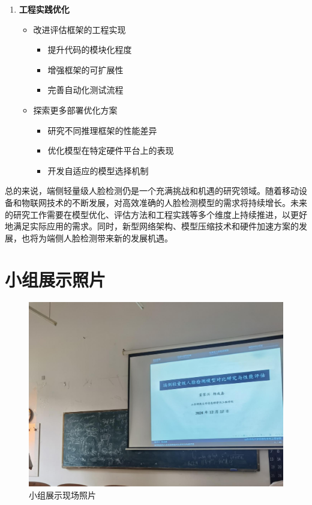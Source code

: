 \documentclass{article}
\begin{document}
\begin{enumerate}
    \item \textbf{工程实践优化}
    \begin{itemize}
        \item 改进评估框架的工程实现
        \begin{itemize}
            \item 提升代码的模块化程度
            \item 增强框架的可扩展性
            \item 完善自动化测试流程
        \end{itemize}
        \item 探索更多部署优化方案
        \begin{itemize}
            \item 研究不同推理框架的性能差异
            \item 优化模型在特定硬件平台上的表现
            \item 开发自适应的模型选择机制
        \end{itemize}
    \end{itemize}
\end{enumerate}

总的来说，端侧轻量级人脸检测仍是一个充满挑战和机遇的研究领域。随着移动设备和物联网技术的不断发展，对高效准确的人脸检测模型的需求将持续增长。未来的研究工作需要在模型优化、评估方法和工程实践等多个维度上持续推进，以更好地满足实际应用的需求。同时，新型网络架构、模型压缩技术和硬件加速方案的发展，也将为端侧人脸检测带来新的发展机遇。

\clearpage




\clearpage
\section{小组展示照片}
\begin{figure}[htbp]
    \centering
    \includegraphics[width=0.8\linewidth]{imgs/presentation.png}
    \caption{小组展示现场照片}
    \label{fig:presentation}
\end{figure}
\end{document}
